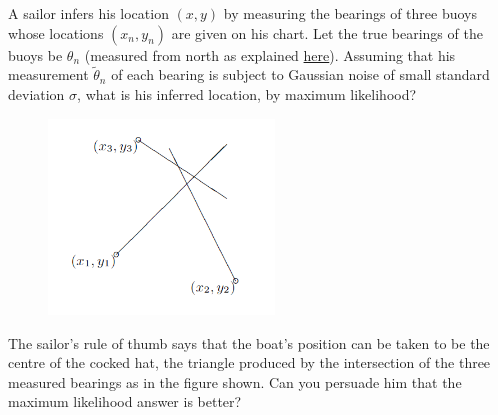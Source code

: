 \documentclass[solution,addpoints,12pt]{exam}
\begin{document}
\begin{questions}
A sailor infers his location $(x,y)$ by measuring the bearings of three buoys whose locations $\left(x_{n},y_{n}\right)$ are given on his chart. Let the true bearings of the buoys be $\theta_{n}$ (measured from north as explained \href{https://www.cimt.org.uk/projects/mepres/book8/bk8i11/bk8_11i3.htm}{here}). Assuming that his measurement $\tilde{\theta}_{n}$ of each bearing is subject to Gaussian noise of small standard deviation $\sigma$, what is his inferred location, by maximum likelihood?
\begin{figure}[htbp!]
    \centering
    \includegraphics[width=6cm]{bearing.png}
\end{figure}

The sailor's rule of thumb says that the boat's position can be taken to be the centre of the cocked hat, the triangle produced by the intersection of the three measured bearings as in the figure shown. Can you persuade him that the maximum likelihood answer is better?
\begin{solution}
\end{solution}


\end{questions}
\end{document}
